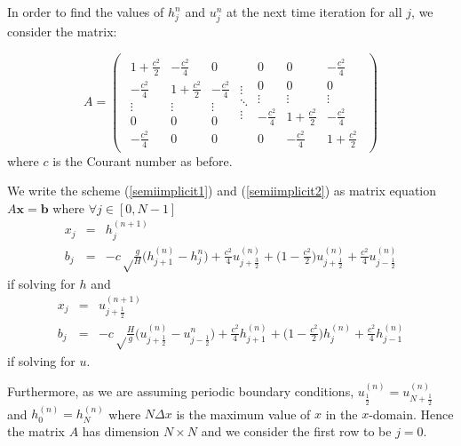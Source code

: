 \documentclass[a4paper,12pt, notitlepage]{article}
\begin{document}
In order to find the values of $h_{j}^{n}$ and $u_{j}^{n}$ at the next time iteration for all $j$, we consider the matrix:

\[
A = \left (
\begin{array}{ccc}
\begin{array}{ccc}
1 + \frac{c^{2}}{2} & -\frac{c^{2}}{4} & 0\\
-\frac{c^{2}}{4}& 1 + \frac{c^{2}}{2} & -\frac{c^{2}}{4} \\
\vdots & \vdots & \vdots\\
0 & 0  & 0 \\
- \frac{c^{2}}{4}  & 0  & 0 
\end{array}
\begin{array}{c}
\vdots\\ 
\ddots\\
\vdots
\end{array}
\begin{array}{ccc}
0  & 0  &  - \frac{c^{2}}{4}\\
0  & 0& 0\\
\vdots & \vdots & \vdots\\
-\frac{c^{2}}{4}& 1 + \frac{c^{2}}{2} & -\frac{c^{2}}{4} \\
0 & -\frac{c^{2}}{4} & 1 + \frac{c^{2}}{2}
\end{array}
\end{array}
\right )
\]
where $c$ is the Courant number as before. 

We write the scheme (\ref{semiimplicit1}) and (\ref{semiimplicit2}) as matrix equation $A \mathbf{x} = \mathbf{b}$ where $ \forall j \in [0, N-1]$
\begin{eqnarray}
x_{j} &= & h_{j}^{(n+1)}\\
b_{j} &= & -c\sqrt\frac{g}{H}\bigg(h_{j + 1}^{(n)} - h_{j}^{n}\bigg) + \frac{c^{2}}{4} u_{j + \frac{3}{2}}^{(n)} + \bigg(1 - \frac{c^{2}}{2}\bigg)u_{j + \frac{1}{2}}^{(n)} + \frac{c^{2}}{4} u_{j - \frac{1}{2}}^{(n)}
\end{eqnarray}
if solving for $h$ and
\begin{eqnarray}
x_{j} & =& u_{j+ \frac{1}{2}}^{(n+1)} \\
b_{j} &= &-c\sqrt\frac{H}{g}\bigg(u_{j + \frac{1}{2}}^{(n)} - u_{j - \frac{1}{2}}^{n}\bigg) + \frac{c^{2}}{4} h_{j + 1}^{(n)} + \bigg(1 - \frac{c^{2}}{2}\bigg)h_{j}^{(n)} + \frac{c^{2}}{4} h_{j - 1}^{(n)}
\end{eqnarray}
if solving for $u$.

Furthermore, as we are assuming periodic boundary conditions, $u_{\frac{1}{2}}^{(n)} = u_{N + \frac{1}{2}}^{(n)}$ and $h_{0}^{(n)} = h_{N}^{(n)}$ where $N\Delta x$ is the maximum value of $x$ in the $x$-domain. Hence the matrix $A$ has dimension $N \times N$ and we consider the first row to be $j = 0$.
\end{document}
